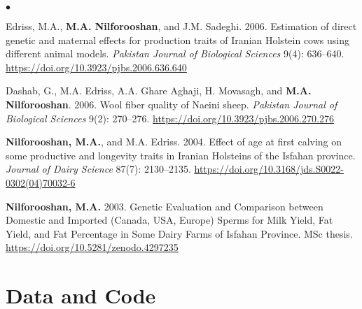 \documentclass[margin,line]{res}
\newenvironment{list2}{
  \begin{list}{$\bullet$}{%
    \setlength{\itemsep}{0in}
    \setlength{\parsep}{0in} \setlength{\parskip}{0in}
    \setlength{\topsep}{0in} \setlength{\partopsep}{0in}
    \setlength{\leftmargin}{0.2in}}}
  {\end{list}}
\begin{document}
\begin{resume}
\begin{list2}
    \item Edriss, M.A., {\bf M.A. Nilforooshan}, and J.M. Sadeghi. 2006. Estimation of direct genetic and maternal effects for production traits of Iranian Holstein cows using different animal models. {\em Pakistan Journal of Biological Sciences} 9(4): 636--640. \url{https://doi.org/10.3923/pjbs.2006.636.640}
    \item Dashab, G., M.A. Edriss, A.A. Ghare Aghaji, H. Movasagh, and {\bf M.A. Nilforooshan}. 2006. Wool fiber quality of Naeini sheep. {\em Pakistan Journal of Biological Sciences} 9(2): 270--276. \url{https://doi.org/10.3923/pjbs.2006.270.276}
    \item {\bf Nilforooshan, M.A.}, and M.A. Edriss. 2004. Effect of age at first calving on some productive and longevity traits in Iranian Holsteins of the Isfahan province. {\em Journal of Dairy Science} 87(7): 2130--2135. \url{https://doi.org/10.3168/jds.S0022-0302(04)70032-6}
    \item {\bf Nilforooshan, M.A.} 2003. Genetic Evaluation and Comparison between Domestic and Imported (Canada, USA, Europe) Sperms for Milk Yield, Fat Yield, and Fat Percentage in Some Dairy Farms of Isfahan Province. MSc thesis. \url{https://doi.org/10.5281/zenodo.4297235}
  \end{list2}
  \section{\sc Data and Code}


\end{resume}
\end{document}
